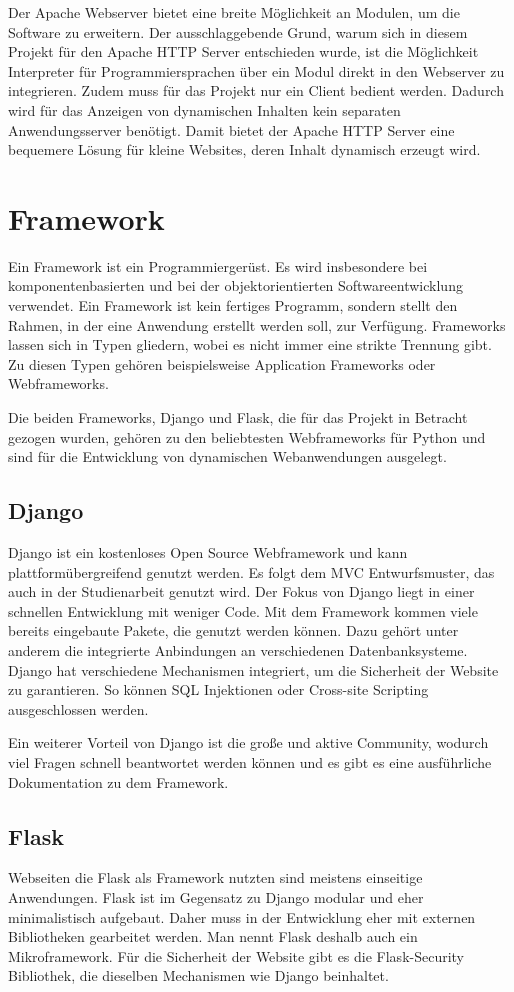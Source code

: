 Der Apache Webserver bietet eine breite Möglichkeit an Modulen, um die Software zu erweitern.
Der ausschlaggebende Grund, warum sich in diesem Projekt für den Apache HTTP Server entschieden wurde, ist die Möglichkeit Interpreter für Programmiersprachen über ein Modul direkt in den Webserver zu integrieren. Zudem muss für das Projekt nur ein Client bedient werden. Dadurch wird für das Anzeigen von dynamischen Inhalten kein separaten  Anwendungsserver benötigt. Damit bietet der Apache HTTP Server eine bequemere Lösung für kleine Websites, deren Inhalt dynamisch erzeugt wird.


\section{Framework}
Ein Framework ist ein Programmiergerüst. Es wird insbesondere bei komponentenbasierten und bei der objektorientierten Softwareentwicklung verwendet. Ein Framework ist kein fertiges Programm, sondern stellt den Rahmen, in der eine Anwendung erstellt werden soll, zur Verfügung. Frameworks lassen sich in Typen gliedern, wobei es nicht immer eine strikte Trennung gibt. Zu diesen Typen gehören beispielsweise  Application Frameworks oder Webframeworks.

Die beiden Frameworks, Django und Flask, die für das Projekt in Betracht gezogen wurden, gehören zu den beliebtesten Webframeworks für Python und sind für die Entwicklung von dynamischen Webanwendungen ausgelegt. 

\subsection{Django}
Django ist ein kostenloses Open Source Webframework und kann plattformübergreifend genutzt werden. Es folgt dem \ac{MVC} Entwurfsmuster, das auch in der Studienarbeit genutzt wird. Der Fokus von Django liegt in einer schnellen Entwicklung mit weniger Code. Mit dem Framework kommen viele bereits eingebaute Pakete, die genutzt werden können. Dazu gehört unter anderem die integrierte Anbindungen an verschiedenen Datenbanksysteme. Django hat verschiedene Mechanismen integriert, um die Sicherheit der Website zu garantieren. So können SQL Injektionen oder Cross-site Scripting ausgeschlossen werden.

Ein weiterer Vorteil von Django ist die große und aktive Community, wodurch viel Fragen schnell beantwortet werden können und es gibt es eine ausführliche Dokumentation zu dem Framework. 

\subsection{Flask}
Webseiten die Flask als Framework nutzten sind meistens einseitige Anwendungen. Flask ist im Gegensatz zu Django modular und eher minimalistisch aufgebaut. Daher muss in der Entwicklung eher mit externen Bibliotheken gearbeitet werden. Man nennt Flask deshalb auch ein Mikroframework. Für die Sicherheit der Website gibt es die Flask-Security Bibliothek, die dieselben Mechanismen wie Django beinhaltet.

